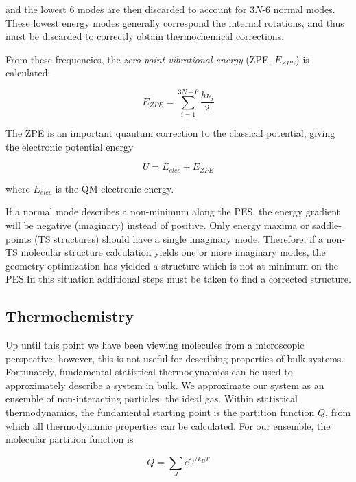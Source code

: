 \noindent and the lowest 6 modes are then discarded to account for 3$N$-6 normal modes. These lowest energy modes generally correspond the internal rotations, and thus must be discarded to correctly obtain thermochemical corrections.

From these frequencies, the \emph{zero-point vibrational energy} (ZPE, $E_{ZPE}$) is calculated:

\begin{equation}
  E_{ZPE} = \sum_{i=1}^{3N-6} \frac{h\nu_i}{2}
\end{equation}

\noindent The ZPE is an important quantum correction to the classical potential, giving the electronic potential energy

\begin{equation}
U = E_{elec} + E_{ZPE}
\end{equation}

\noindent where $E_{elec}$ is the QM electronic energy.

If a normal mode describes a non-minimum along the PES, the energy gradient will be negative (imaginary) instead of positive. Only energy maxima or saddle-points (TS structures) should have a single imaginary mode. Therefore, if a non-TS molecular structure calculation yields one or more imaginary modes, the geometry optimization has yielded a structure which is not at minimum on the PES.\@ In this situation additional steps must be taken to find a corrected structure.

\subsection{Thermochemistry}

Up until this point we have been viewing molecules from a microscopic perspective; however, this is not useful for describing properties of bulk systems. Fortunately, fundamental statistical thermodynamics can be used to approximately describe a system in bulk.\cite{McQuarrie1999,McQuarrie2000} We approximate our system as an ensemble of non-interacting particles: the ideal gas. Within statistical thermodynamics, the fundamental starting point is the partition function $Q$,\cite{note4} from which all thermodynamic properties can be calculated. For our ensemble, the molecular partition function is

\begin{equation}
  Q = \sum_J e^{\varepsilon_j/k_B T}
\end{equation}

